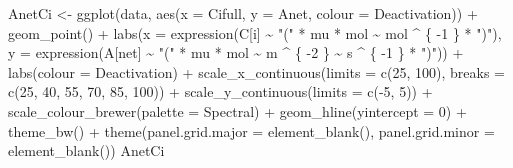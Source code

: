 \documentclass[
]{krantz}
\makeatletter
\newenvironment{Shaded}{\begin{snugshade}}{\end{snugshade}}
\newcommand{\AttributeTok}[1]{\textcolor[rgb]{0.77,0.63,0.00}{#1}}
\newcommand{\DecValTok}[1]{\textcolor[rgb]{0.00,0.00,0.81}{#1}}
\newcommand{\FunctionTok}[1]{\textcolor[rgb]{0.00,0.00,0.00}{#1}}
\newcommand{\NormalTok}[1]{#1}
\newcommand{\OtherTok}[1]{\textcolor[rgb]{0.56,0.35,0.01}{#1}}
\newcommand{\SpecialCharTok}[1]{\textcolor[rgb]{0.00,0.00,0.00}{#1}}
\newcommand{\StringTok}[1]{\textcolor[rgb]{0.31,0.60,0.02}{#1}}
\newenvironment{kframe}{%
\medskip{}
\setlength{\fboxsep}{.8em}
 \def\at@end@of@kframe{}%
 \ifinner\ifhmode%
  \def\at@end@of@kframe{\end{minipage}}%
  \begin{minipage}{\columnwidth}%
 \fi\fi%
 \def\FrameCommand##1{\hskip\@totalleftmargin \hskip-\fboxsep
 \colorbox{shadecolor}{##1}\hskip-\fboxsep
     \hskip-\linewidth \hskip-\@totalleftmargin \hskip\columnwidth}%
 \MakeFramed {\advance\hsize-\width
   \@totalleftmargin\z@ \linewidth\hsize
   \@setminipage}}%
 {\par\unskip\endMakeFramed%
 \at@end@of@kframe}
\renewenvironment{Shaded}{\begin{kframe}}{\end{kframe}}
\makeatother
\begin{document}
\begin{Shaded}
\begin{Highlighting}[]
\NormalTok{AnetCi }\OtherTok{\textless{}{-}}
  \FunctionTok{ggplot}\NormalTok{(data, }\FunctionTok{aes}\NormalTok{(}\AttributeTok{x =}\NormalTok{ Cifull, }\AttributeTok{y =}\NormalTok{ Anet, }\AttributeTok{colour =}\NormalTok{ Deactivation)) }\SpecialCharTok{+}
  \FunctionTok{geom\_point}\NormalTok{() }\SpecialCharTok{+}
  \FunctionTok{labs}\NormalTok{(}\AttributeTok{x =} \FunctionTok{expression}\NormalTok{(C[i] }\SpecialCharTok{\textasciitilde{}} \StringTok{"("} \SpecialCharTok{*}\NormalTok{ mu }\SpecialCharTok{*}\NormalTok{ mol }\SpecialCharTok{\textasciitilde{}}\NormalTok{ mol }\SpecialCharTok{\^{}}\NormalTok{ \{}
    \SpecialCharTok{{-}}\DecValTok{1}
\NormalTok{  \} }\SpecialCharTok{*} \StringTok{")"}\NormalTok{),}
  \AttributeTok{y =} \FunctionTok{expression}\NormalTok{(A[net] }\SpecialCharTok{\textasciitilde{}} \StringTok{"("} \SpecialCharTok{*}\NormalTok{ mu }\SpecialCharTok{*}\NormalTok{ mol }\SpecialCharTok{\textasciitilde{}}\NormalTok{ m }\SpecialCharTok{\^{}}\NormalTok{ \{}
    \SpecialCharTok{{-}}\DecValTok{2}
\NormalTok{  \} }\SpecialCharTok{\textasciitilde{}}\NormalTok{ s }\SpecialCharTok{\^{}}\NormalTok{ \{}
    \SpecialCharTok{{-}}\DecValTok{1}
\NormalTok{  \} }\SpecialCharTok{*} \StringTok{")"}\NormalTok{)) }\SpecialCharTok{+}
  \FunctionTok{labs}\NormalTok{(}\AttributeTok{colour =} \StringTok{\textquotesingle{}Deactivation\textquotesingle{}}\NormalTok{) }\SpecialCharTok{+}
  \FunctionTok{scale\_x\_continuous}\NormalTok{(}\AttributeTok{limits =} \FunctionTok{c}\NormalTok{(}\DecValTok{25}\NormalTok{, }\DecValTok{100}\NormalTok{),}
                     \AttributeTok{breaks =} \FunctionTok{c}\NormalTok{(}\DecValTok{25}\NormalTok{, }\DecValTok{40}\NormalTok{, }\DecValTok{55}\NormalTok{, }\DecValTok{70}\NormalTok{, }\DecValTok{85}\NormalTok{, }\DecValTok{100}\NormalTok{)) }\SpecialCharTok{+}
  \FunctionTok{scale\_y\_continuous}\NormalTok{(}\AttributeTok{limits =} \FunctionTok{c}\NormalTok{(}\SpecialCharTok{{-}}\DecValTok{5}\NormalTok{, }\DecValTok{5}\NormalTok{)) }\SpecialCharTok{+}
  \FunctionTok{scale\_colour\_brewer}\NormalTok{(}\AttributeTok{palette =} \StringTok{\textquotesingle{}Spectral\textquotesingle{}}\NormalTok{) }\SpecialCharTok{+}
  \FunctionTok{geom\_hline}\NormalTok{(}\AttributeTok{yintercept =} \DecValTok{0}\NormalTok{) }\SpecialCharTok{+}
  \FunctionTok{theme\_bw}\NormalTok{() }\SpecialCharTok{+}
  \FunctionTok{theme}\NormalTok{(}\AttributeTok{panel.grid.major =} \FunctionTok{element\_blank}\NormalTok{(),}
        \AttributeTok{panel.grid.minor =} \FunctionTok{element\_blank}\NormalTok{())}
\NormalTok{AnetCi}
\end{Highlighting}
\end{Shaded}
\end{document}
